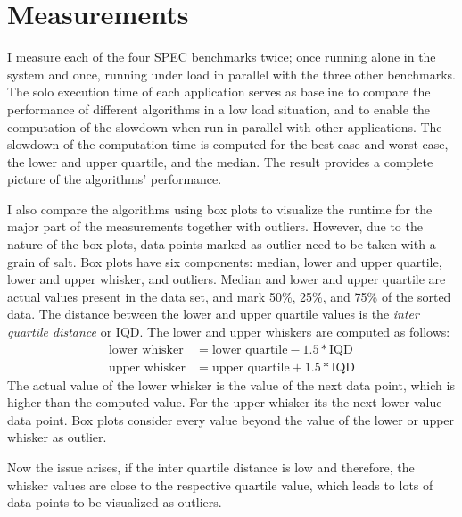 \section{Measurements}
\label{eval:measurements}

I measure each of the four SPEC benchmarks twice; once running alone in the
system and once, running under load in parallel with the three other benchmarks.
The solo execution time of each application serves as baseline to compare the
performance of different algorithms in a low load situation, and to enable the
computation of the slowdown when run in parallel with other applications.
The slowdown of the computation time is computed for the best case and worst
case, the lower and upper quartile, and the median.
The result provides a complete picture of the algorithms' performance.

I also compare the algorithms using box plots to visualize
the runtime for the major part of the measurements together with outliers.
However, due to the nature of the box plots, data points marked as outlier need
to be taken with a grain of salt. 
Box plots have six components: median, lower and upper quartile, lower and
upper whisker, and outliers.
Median and lower and upper quartile are actual values present in the data set,
and mark 50\%, 25\%, and 75\% of the sorted data.
The distance between the lower and upper quartile values is the \emph{inter
quartile distance} or IQD.
The lower and upper whiskers are computed as follows:
%
\begin{align*}
  \text{lower whisker} &= \text{lower quartile} - 1.5 * \text{IQD}\\
  \text{upper whisker} &= \text{upper quartile} + 1.5 * \text{IQD}
\end{align*}
%
The actual value of the lower whisker is the value of the next data point,
which is higher than the computed value.
For the upper whisker its the next lower value data point.
Box plots consider every value beyond the value of the lower or upper whisker
as outlier.

Now the issue arises, if the inter quartile distance is low and therefore,
the whisker values are close to the respective quartile value, which leads to
lots of data points to be visualized as outliers.



